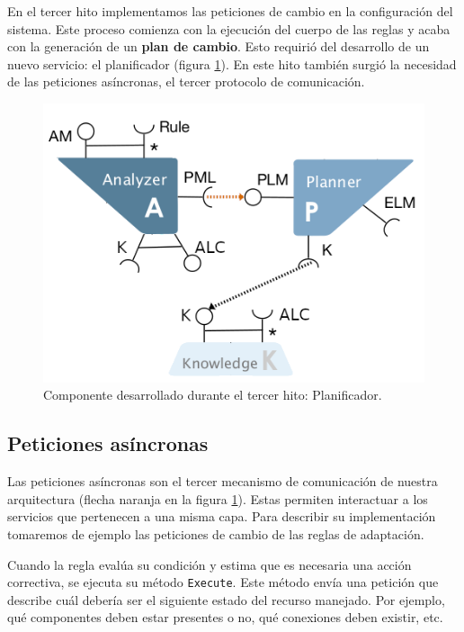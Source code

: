 En el tercer hito implementamos las peticiones de cambio en la configuración del sistema. Este proceso comienza con la ejecución del cuerpo de las reglas y acaba con la generación de un \textbf{plan de cambio}. Esto requirió del desarrollo de un nuevo servicio: el planificador (figura \ref{fig:hito-3-planificador}). En este hito también surgió la necesidad de las peticiones asíncronas, el tercer protocolo de comunicación.

\begin{figure}[h!]
  \centering
  \includegraphics[scale=0.50]{cap_implementacion/images/hito-3-planificador}
  \caption{Componente desarrollado durante el tercer hito: Planificador.}
  \label{fig:hito-3-planificador}
\end{figure}

\subsection{Peticiones asíncronas}

Las peticiones asíncronas son el tercer mecanismo de comunicación de nuestra arquitectura (flecha naranja en la figura \ref{fig:hito-3-planificador}). Estas permiten interactuar a los servicios que pertenecen a una misma capa. Para describir su implementación tomaremos de ejemplo las peticiones de cambio de las reglas de adaptación.

Cuando la regla evalúa su condición y estima que es necesaria una acción correctiva, se ejecuta su método \texttt{Execute}. Este método envía una petición que describe cuál debería ser el siguiente estado del recurso manejado. Por ejemplo, qué componentes deben estar presentes o no, qué conexiones deben existir, etc.

